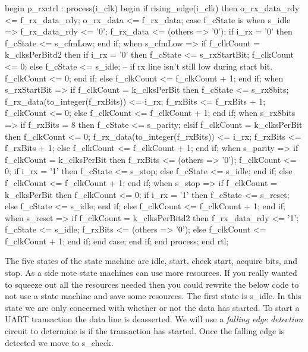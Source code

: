\begin{VHDLlisting}[tabsize=8]
begin
  p_rxctrl : process(i_clk) 
  begin
    if rising_edge(i_clk) then
      o_rx_data_rdy <= f_rx_data_rdy;
      o_rx_data <= f_rx_data;
      case f_cState is
        when s_idle => 
          f_rx_data_rdy <= '0';
          f_rx_data <= (others => '0');
          if i_rx = '0' then
            f_cState <= s_cfmLow;
          end if;
        when s_cfmLow =>
          if f_clkCount = k_clksPerBitd2 then
            if i_rx = '0' then
              f_cState <= s_rxStartBit;
              f_clkCount <= 0;  
            else 
              f_cState <= s_idle; -- if rx line isn't still low during start bit.
              f_clkCount <= 0;
            end if;
          else
            f_clkCount <= f_clkCount + 1;
          end if;
        when s_rxStartBit =>
          if f_clkCount = k_clksPerBit then
            f_cState <= s_rx8bits;
            f_rx_data(to_integer(f_rxBits)) <= i_rx;
            f_rxBits <= f_rxBits + 1;
            f_clkCount <= 0;
          else 
            f_clkCount <= f_clkCount + 1;
          end if;        
        when s_rx8bits =>
          if f_rxBits = 8 then
            f_cState <= s_parity;
          elsif f_clkCount = k_clksPerBit then 
            f_clkCount <= 0;
            f_rx_data(to_integer(f_rxBits)) <= i_rx;
            f_rxBits <= f_rxBits + 1;
          else 
            f_clkCount <= f_clkCount + 1;
          end if;
        when s_parity =>
          if f_clkCount = k_clksPerBit then
            f_rxBits <= (others => '0');
            f_clkCount <= 0;
            if i_rx = '1' then
              f_cState <= s_stop;
            else
              f_cState <= s_idle;
            end if;
          else
            f_clkCount <= f_clkCount + 1;
          end if;
        when s_stop => 
          if f_clkCount = k_clksPerBit then
            f_clkCount <= 0;
            if i_rx = '1' then
              f_cState <= s_reset;
            else
              f_cState <= s_idle;
            end if;
          else
            f_clkCount <= f_clkCount + 1;
          end if;
        when s_reset =>
          if f_clkCount = k_clksPerBitd2 then
            f_rx_data_rdy <= '1';
            f_cState <= s_idle;
            f_rxBits <= (others => '0');
          else
            f_clkCount <= f_clkCount + 1;
          end if;
      end case; 
    end if;
  end process;
end rtl;
\end{VHDLlisting}

The five states of the state machine are idle, start, check start, acquire bits, and stop. As a side note state machines can use more resources. If you really wanted to squeeze out all the resources needed then you could rewrite the below code to not use a state machine and save some resources. The first state is s\_idle. In this state we are only concerned with whether or not the data has started. To start a \ac{UART} transaction the data line is deasserted. We will use a \emph{falling edge detection} circuit to determine is if the transaction has started. Once the falling edge is detected we move to s\_check.

